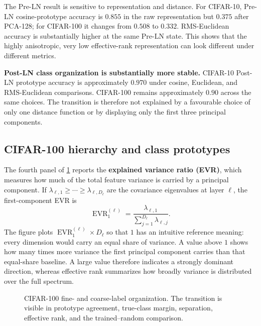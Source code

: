The Pre-LN result is sensitive to representation and distance. For CIFAR-10,
Pre-LN cosine-prototype accuracy is $0.855$ in the raw representation but
$0.375$ after PCA-128; for CIFAR-100 it changes from $0.508$ to $0.332$.
RMS-Euclidean accuracy is substantially higher at the same Pre-LN state. This
shows that the highly anisotropic, very low effective-rank representation can
look different under different metrics.

\textbf{Post-LN class organization is substantially more stable.} CIFAR-10
Post-LN prototype accuracy is approximately $0.970$ under cosine, Euclidean,
and RMS-Euclidean comparisons. CIFAR-100 remains approximately $0.90$ across
the same choices. The transition is therefore not explained by a favourable
choice of only one distance function or by displaying only the first three
principal components.

\subsection{CIFAR-100 hierarchy and class prototypes}

The fourth panel of \cref{fig:pca-cifar100-hierarchy} reports the
\textbf{explained variance ratio (EVR)}, which measures how much of the total
feature variance is carried by a principal component. If
$\lambda_{\ell,1}\geq\cdots\geq\lambda_{\ell,D_\ell}$ are the covariance
eigenvalues at layer $\ell$, the first-component EVR is
\begin{equation}
    \operatorname{EVR}_{1}^{(\ell)}
    =
    \frac{\lambda_{\ell,1}}
         {\sum_{j=1}^{D_\ell}\lambda_{\ell,j}}.
    \label{eq:pca-evr-one}
\end{equation}
The figure plots $\operatorname{EVR}_{1}^{(\ell)}\times D_\ell$ so that $1$
has an intuitive reference meaning: every dimension would carry an equal
share of variance. A value above $1$ shows how many times more variance the
first principal component carries than that equal-share baseline. A large
value therefore indicates a strongly dominant direction, whereas effective
rank summarizes how broadly variance is distributed over the full spectrum.

\begin{figure}[!htbp]
    \centering
    \caption{CIFAR-100 fine- and coarse-label organization. The transition is
    visible in prototype agreement, true-class margin, separation, effective
    rank, and the trained--random comparison.}
    \label{fig:pca-cifar100-hierarchy}
\end{figure}


